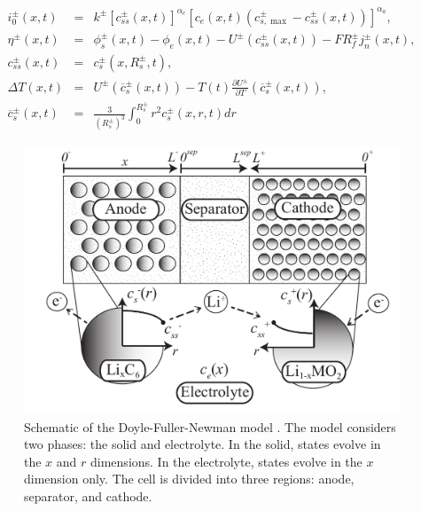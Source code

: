 \documentclass[12pt]{article}
\begin{document}
\begin{eqnarray}
	i_{0}^{\pm}(x,t) &=& k^{\pm}  \left[ c_{ss}^{\pm}(x,t) \right]^{\alpha_{c}} \left[c_{e}(x,t) \left(c_{s,\max}^{\pm} - c_{ss}^{\pm}(x,t)  \right) \right]^{\alpha_{a}}, \label{eqn:i0} \\
	\eta^{\pm}(x,t) &=& \phi_{s}^{\pm}(x,t) - \phi_{e}(x,t) - U^{\pm}(c_{ss}^{\pm}(x,t)) - F R_{f}^{\pm} j_{n}^{\pm}(x,t), \label{eqn:eta} \\
	c_{ss}^{\pm}(x,t) &=& c_{s}^{\pm}(x,R_{s}^{\pm},t), \label{eqn:css} \\
	\Delta T(x,t) &=& U^{\pm}(\overline{c}^{\pm}_{s}(x,t)) - T(t) \frac{\partial U^{\pm}}{\partial T}(\overline{c}^{\pm}_{s}(x,t)), \\
	\overline{c}_{s}^{\pm}(x,t) &=& \frac{3}{(R_{s}^{\pm})^{3}} \int_{0}^{R_{s}^{\pm}} r^{2} c_{s}^{\pm}(x,r,t) dr \label{eqn:cbulk}
\end{eqnarray}

\begin{figure}[t]
  \centering
  \includegraphics[trim = 0.4in 0.1in 0.15in 0.05in, clip, width=4.5in]{dfn-schematic.pdf}
  \caption{Schematic of the Doyle-Fuller-Newman model \cite{Thomas2002}. The model considers two phases: the solid and electrolyte. In the solid, states evolve in the $x$ and $r$ dimensions. In the electrolyte, states evolve in the $x$ dimension only. The cell is divided into three regions: anode, separator, and cathode.}
  \label{fig:dfn-schematic}
\end{figure}
\end{document}
